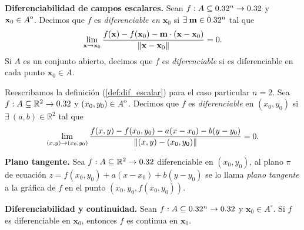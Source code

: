 \begin{definition}\textbf{Diferenciabilidad de campos escalares.} \label{def:dif_escalar}
\mbox{}
Sean $f: A  \subseteq  0.32^n \to 0.32$ y $\mathbf{x}_0 \in {\kern0ptA}^{\mathrm{o}}$. Decimos que $f$ es \emph{diferenciable en $\mathbf{x}_0$} si $\exists\:\mathbf{m} \in 0.32^n$ tal que
\[
  \lim_{\mathbf{x} \to \mathbf{x}_0} \frac{f(\mathbf{x}) - f(\mathbf{x}_0) - \mathbf{m} \cdot (\mathbf{x} - \mathbf{x}_0)}{\norm{\mathbf{x} - \mathbf{x}_0}} = 0.
\]
Si $A$ es un conjunto abierto, decimos que $f$ es \emph{diferenciable} si es diferenciable en cada punto $\mathbf{x}_0 \in A$.
\end{definition}



\begin{obs} \label{def:dif_escalar_n2}  Reescribamos  la definici\'on  (\ref{def:dif_escalar}) para el caso particular $n=2$.   Sea $f: A  \subseteq  \mathbb{R}^{2} \to 0.32$ y $(x_0,y_0) \in {\kern0ptA}^{\mathrm{o}}$.  Decimos que $f$ es \emph{diferenciable} en $(x_0,y_0)$  si $\exists\: (a,b)  \in \mathbb{R}^{2}$ tal que
\[
  \lim_{ (x,y) \to   (x_0, y_0)}   \frac{ f(x,y ) - f( x_0,y_0 ) - a(x-x_0) - b(y-y_0)}{\norm{ (x,y)-(x_0,y_0) } }   = 0.
\]
\end{obs}

\begin{definition} \textbf{Plano tangente.}\label{def:plano_tangente} Sea $f: A  \subseteq  \mathbb{R}^{2} \to 0.32$ diferenciable en $(x_0,y_0)$,  al plano $\pi$  de ecuaci\'on $z =  f( x_0,y_0 ) + a(x-x_0) + b(y-y_0)$ se lo llama \emph{plano tangente} a la gr\'afica de $f$ en el punto $(x_0, y_0, f(x_0, y_0)).$
\end{definition}



\begin{theorem}\textbf{Diferenciabilidad y continuidad.} \label{teo:difCont} Sean $f: A  \subseteq  0.32^n \to 0.32$ y $\mathbf{x}_0 \in  A^{\circ}$. Si $f$ es diferenciable en $\mathbf{x}_0$, entonces $f$ es continua en $\mathbf{x}_0$.
\end{theorem}

